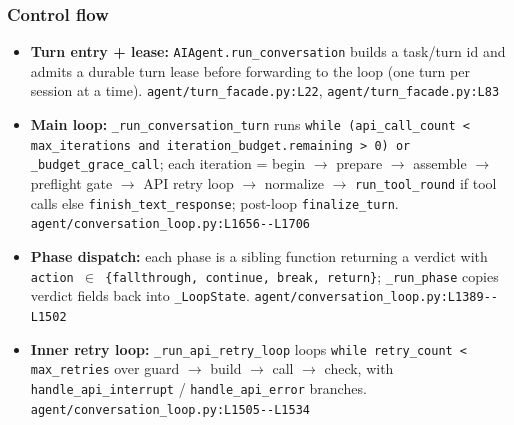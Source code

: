 \subsubsection*{Control flow}
\begin{itemize}
\item \textbf{Turn entry + lease:} \texttt{AIAgent.\allowbreak{}run\_\allowbreak{}conversation} builds a task/turn id and admits a durable turn lease before forwarding to the loop (one turn per session at a time). \texttt{agent/\allowbreak{}turn\_\allowbreak{}facade.\allowbreak{}py:\allowbreak{}L22}, \texttt{agent/\allowbreak{}turn\_\allowbreak{}facade.\allowbreak{}py:\allowbreak{}L83}
\item \textbf{Main loop:} \texttt{\_\allowbreak{}run\_\allowbreak{}conversation\_\allowbreak{}turn} runs \texttt{while (\allowbreak{}api\_\allowbreak{}call\_\allowbreak{}count < max\_\allowbreak{}iterations and iteration\_\allowbreak{}budget.\allowbreak{}remaining > 0) or \_\allowbreak{}budget\_\allowbreak{}grace\_\allowbreak{}call}; each iteration = begin $\rightarrow$ prepare $\rightarrow$ assemble $\rightarrow$ preflight gate $\rightarrow$ API retry loop $\rightarrow$ normalize $\rightarrow$ \texttt{run\_\allowbreak{}tool\_\allowbreak{}round} if tool calls else \texttt{finish\_\allowbreak{}text\_\allowbreak{}response}; post-loop \texttt{finalize\_\allowbreak{}turn}. \texttt{agent/\allowbreak{}conversation\_\allowbreak{}loop.\allowbreak{}py:\allowbreak{}L1656-\allowbreak{}-\allowbreak{}L1706}
\item \textbf{Phase dispatch:} each phase is a sibling function returning a verdict with \texttt{action $\in$ \{fallthrough, continue, break, return\}}; \texttt{\_\allowbreak{}run\_\allowbreak{}phase} copies verdict fields back into \texttt{\_\allowbreak{}LoopState}. \texttt{agent/\allowbreak{}conversation\_\allowbreak{}loop.\allowbreak{}py:\allowbreak{}L1389-\allowbreak{}-\allowbreak{}L1502}
\item \textbf{Inner retry loop:} \texttt{\_\allowbreak{}run\_\allowbreak{}api\_\allowbreak{}retry\_\allowbreak{}loop} loops \texttt{while retry\_\allowbreak{}count < max\_\allowbreak{}retries} over guard $\rightarrow$ build $\rightarrow$ call $\rightarrow$ check, with \texttt{handle\_\allowbreak{}api\_\allowbreak{}interrupt} / \texttt{handle\_\allowbreak{}api\_\allowbreak{}error} branches. \texttt{agent/\allowbreak{}conversation\_\allowbreak{}loop.\allowbreak{}py:\allowbreak{}L1505-\allowbreak{}-\allowbreak{}L1534}

\end{itemize}
